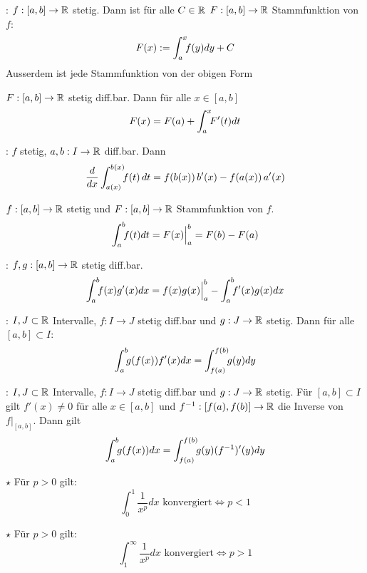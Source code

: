 \Satz {}: $f: [a, b] \to \mathbb{R}$ stetig.
Dann ist für alle $C \in \mathbb{R}$ $F: [a, b] \to \mathbb{R}$ Stammfunktion von $f$:
$$F(x) := \int_{a}^{x} \hspace{-4pt} f(y) dy + C$$
Ausserdem ist jede Stammfunktion von der obigen Form

\Kor $F: [a, b] \to \mathbb{R}$ stetig diff.bar. Dann für alle $x \in [a, b]$
$$F(x) = F(a) + \int_{a}^{x} \hspace{-4pt}F'(t) dt$$

\Kor {}: $f$ stetig, $a, b: I \to \mathbb{R}$ diff.bar. Dann
$$\frac{d}{dx}\int_{a(x)}^{b(x)} \hspace{-4pt} f(t)\,dt = f(b(x))\,b'(x) - f(a(x))\,a'(x)$$

\Kor $f: [a, b] \to \mathbb{R}$ stetig und $F: [a, b] \to \mathbb{R}$ Stammfunktion von $f$.
$$\int_a^b \hspace{-4pt} f(t) dt = F(x)\Big|_a^b = F(b) - F(a)$$

\Satz {}: $f,g: [a, b] \to \mathbb{R}$ stetig diff.bar.
$$\int_a^b \hspace{-4pt} f(x)g'(x) dx = f(x)g(x) \Big|_a^b - \int_a^b \hspace{-4pt} f'(x)g(x) dx$$

\Satz {}: $I, J \subset \mathbb{R}$ Intervalle, $f: I \to J$ stetig diff.bar und
$g: J \to \mathbb{R}$ stetig. Dann für alle $[a, b] \subset I$:
$$\int_a^b \hspace{-4pt} g(f(x))f'(x) dx = \int_{f(a)}^{f(b)} \hspace{-4pt} g(y) dy$$

\Satz {}: $I, J \subset \mathbb{R}$ Intervalle, $f: I \to J$ stetig diff.bar
und $g: J \to \mathbb{R}$ stetig. Für $[a, b] \subset I$ gilt $f'(x) \ne 0$ für alle $x \in [a, b]$
und $f^{-1}: [f(a), f(b)] \to \mathbb{R}$ die Inverse von $f\Big|_{[a,b]}$. Dann gilt
$$\int_a^b \hspace{-4pt} g(f(x)) dx = \int_{f(a)}^{f(b)} \hspace{-4pt} g(y)(f^{-1})'(y)dy$$

\Satz $\star$ Für $p > 0$ gilt:
$$\int_{0}^{1} \frac{1}{x^p} dx \text{ konvergiert} \iff p < 1$$

\Satz $\star$ Für $p > 0$ gilt:
$$\int_{1}^{\infty} \frac{1}{x^p} dx \text{ konvergiert} \iff p > 1$$
